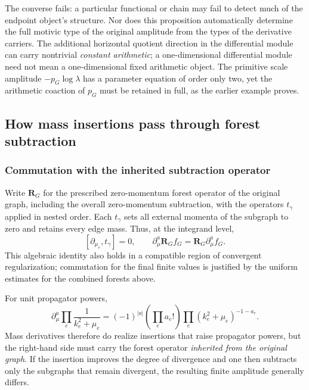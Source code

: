 \documentclass[11pt,a4paper,oneside]{article}
\theoremstyle{plain}
\theoremstyle{definition}
\theoremstyle{remark}
\numberwithin{equation}{section}
\begin{document}
The converse fails: a particular functional or chain may fail to detect much of the endpoint object's structure.
Nor does this proposition automatically determine the full motivic type of the original amplitude from the types of the derivative carriers.
The additional horizontal quotient direction in the differential module can carry nontrivial \emph{constant arithmetic}; a one-dimensional differential module need not mean a one-dimensional fixed arithmetic object.
The primitive scale amplitude $-p_G\log\lambda$ has a parameter equation of order only two, yet the arithmetic coaction of $p_G$ must be retained in full, as the earlier example proves.


\subsection{How mass insertions pass through forest subtraction}
\subsubsection{Commutation with the inherited subtraction operator}
Write $\mathbf R_G$ for the prescribed zero-momentum forest operator of the original graph, including the overall zero-momentum subtraction, with the operators $t_\gamma$ applied in nested order.
Each $t_\gamma$ sets all external momenta of the subgraph to zero and retains every edge mass.
Thus, at the integrand level,
\begin{equation}\label{descent:eq:commute}
 [\partial_{\mu_e},t_\gamma]=0,\qquad
 \partial_\mu^a\mathbf R_G f_G
                =\mathbf R_G\partial_\mu^a f_G.
\end{equation}
This algebraic identity also holds in a compatible region of convergent regularization; commutation for the final finite values is justified by the uniform estimates for the combined forests above.

For unit propagator powers,
\begin{equation}\label{descent:eq:insert}
 \partial_\mu^a\prod_e\frac1{k_e^2+\mu_e}
 =(-1)^{|a|}\left(\prod_e a_e!\right)
              \prod_e(k_e^2+\mu_e)^{-1-a_e}.
\end{equation}
Mass derivatives therefore do realize insertions that raise propagator powers, but the right-hand side must carry the forest operator \emph{inherited from the original graph}.
If the insertion improves the degree of divergence and one then subtracts only the subgraphs that remain divergent, the resulting finite amplitude generally differs.
\end{document}
